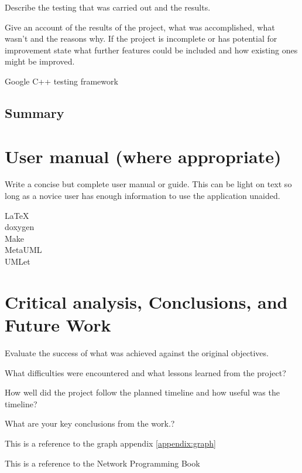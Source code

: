 \documentclass[12pt,a4paper,titlepage]{article}
\begin{document}
Describe the testing that was carried out and the results.

Give an account of the results of the project, what was accomplished, what wasn't and the reasons why. If the project is incomplete or has potential for improvement state what further features could be included and how existing ones might be improved.

Google C++ testing framework

\subsection{Summary}


\section{User manual (where appropriate)}
Write a concise but complete user manual or guide. This can be light on text so long as a novice user has enough information to use the application unaided.

LaTeX\\
doxygen\\
Make\\
MetaUML\\
UMLet\\

\section{Critical analysis, Conclusions, and Future Work}

Evaluate the success of what was achieved against the original objectives. 

What difficulties were encountered and what lessons learned from the project? 

How well did the project follow the planned timeline and how useful was the timeline?  

What are your key conclusions from the work.?

This is a reference to the graph appendix \ref{appendix:graph}

This is a reference to the Network Programming Book \cite[p.~215]{stevensunp}

\newpage
\end{document}
